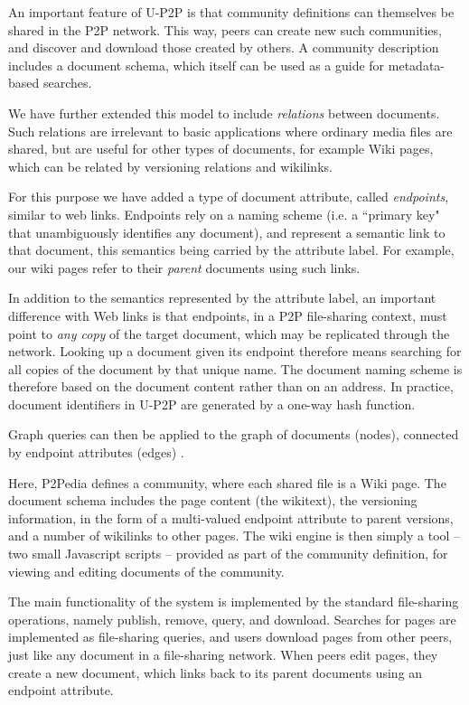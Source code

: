 An important feature of U-P2P is that community definitions can themselves be shared in the P2P network. This way, peers can create new such communities, and discover and download those created by others. A community description includes a document schema, which itself can be used as a guide for metadata-based searches.

We have further extended this model to include \emph{relations} between documents. Such relations are irrelevant to basic applications where ordinary media files are shared, but are useful for other types of documents, for example Wiki pages, which can be related by versioning relations and wikilinks.

For this purpose we have added a type of document attribute, called \emph{endpoints}, similar to web links. Endpoints rely on a naming scheme (i.e. a ``primary key" that unambiguously identifies any document), and represent a semantic link to that document, this semantics being carried by the attribute label. For example, our wiki pages refer to their \emph{parent} documents using such links. 

In addition to the semantics represented by the attribute label, an important difference with Web links is that endpoints, in a P2P file-sharing context, must point to \emph{any copy} of the target document, which may be replicated through the network. Looking up a document given its endpoint therefore means searching for all copies of the document by that unique name. The document naming scheme is therefore based on the document content rather than on an address. In practice, document identifiers in U-P2P are generated by a one-way hash function.

Graph queries can then be applied to the graph of documents (nodes), connected by endpoint attributes (edges) \cite{UP2P:201101TechReport}. 

Here, P2Pedia defines a community, where each shared file is a Wiki page. The document schema includes the page content (the wikitext), the versioning information, in the form of a multi-valued endpoint attribute to parent versions, and a number of wikilinks to other pages. The wiki engine is then simply a tool -- two small Javascript scripts -- provided as part of the community definition, for viewing and editing documents of the community.

The main functionality of the system is implemented by the standard file-sharing operations, namely publish, remove, query, and download. Searches for pages are implemented as file-sharing queries, and users download pages from other peers, just like any document in a file-sharing network. When peers edit pages, they create a new document, which links back to its parent documents using an endpoint attribute.

